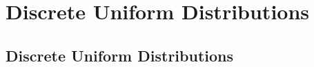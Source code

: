 \documentclass[../maths.tex]{subfiles}
\begin{document}
\chapter{Discrete Uniform Distributions}
\section{Discrete Uniform Distributions}
\end{document}
